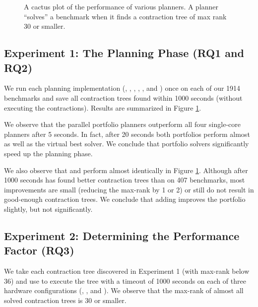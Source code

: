 \begin{figure}
	\centering
	
    \vspace*{-0.7cm}
	\caption{\label{fig:parallel:planning} A cactus plot of the performance of various planners. A planner ``solves'' a benchmark when it finds a contraction tree of max rank 30 or smaller.}
\end{figure}

\subsection{Experiment 1: The Planning Phase (RQ1 and RQ2)}
We run each planning implementation (, , , , , and ) once on each of our 1914 benchmarks and save all contraction trees found within 1000 seconds (without executing the contractions). Results are summarized in Figure \ref{fig:parallel:planning}. 


%


We observe that the parallel portfolio planners outperform all four single-core planners after 5 seconds. In fact, after 20 seconds both portfolios perform almost as well as the virtual best solver. We conclude that portfolio solvers significantly speed up the planning phase.

We also observe that  and  perform almost identically in Figure \ref{fig:parallel:planning}. Although after 1000 seconds  has found better contraction trees than  on 407 benchmarks, most improvements are small (reducing the max-rank by 1 or 2) or still do not result in good-enough contraction trees. We conclude that adding  improves the portfolio slightly, but not significantly.
 
\subsection{Experiment 2: Determining the Performance Factor (RQ3)}
\label{sec:experiments:pf}
We take each contraction tree discovered in Experiment 1 (with max-rank below 36) and use  to execute the tree with a timeout of 1000 seconds on each of three hardware configurations (, , and ). We observe that the max-rank of almost all solved contraction trees is 30 or smaller.

